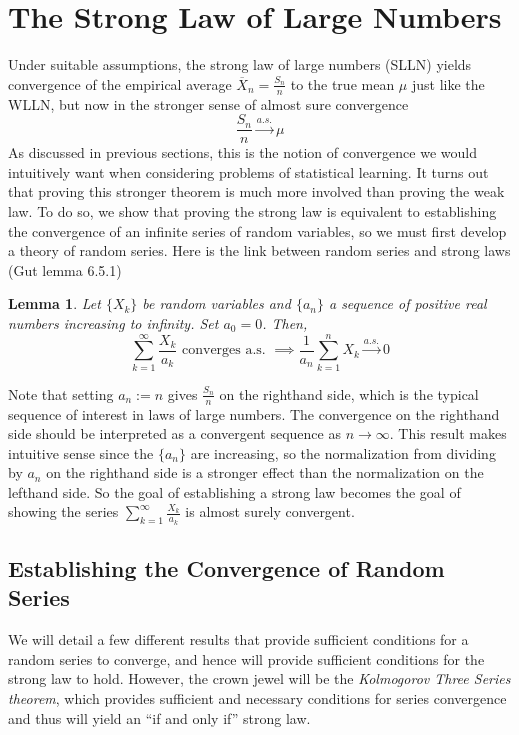 \documentclass[12pt]{article}
\newtheorem{lemma}{Lemma}
\begin{document}
\section{The Strong Law of Large Numbers}
Under suitable assumptions, the strong law of large numbers (SLLN) yields convergence of the empirical average $\overline{X}_n = \frac{S_n}{n}$ to the true mean $\mu$ just like the WLLN, but now in the stronger 
sense of almost sure convergence
\[\frac{S_n}{n} \overset{a.s.}{\to} \mu\]
As discussed in previous sections, this is the notion of convergence we would intuitively want when considering problems of statistical learning. It turns out that proving this stronger theorem is much more involved than 
proving the weak law. To do so, we show that proving the strong law is equivalent to establishing the convergence of an infinite series of random variables, so we must first develop a theory of random series. Here is the 
link between random series and strong laws (Gut lemma 6.5.1)
\begin{lemma}
Let $\{X_k\}$ be random variables and $\{a_n\}$ a sequence of positive real numbers increasing to infinity. Set $a_0 = 0$. Then, 
\[\sum_{k = 1}^{\infty} \frac{X_k}{a_k} \text{ converges a.s. } \implies \frac{1}{a_n} \sum_{k = 1}^{n} X_k \overset{a.s.}{\to} 0\]
\end{lemma}
Note that setting $a_n := n$ gives $\frac{S_n}{n}$ on the righthand side, which is the typical sequence of interest in laws of large numbers. The convergence on the righthand side should be interpreted 
as a convergent sequence as $n \to \infty$. This result makes intuitive sense since the $\{a_n\}$ are increasing, so the normalization from dividing by $a_n$ on the righthand side is a stronger effect than 
the normalization on the lefthand side. So the goal of establishing a strong law becomes the goal of showing the series $\sum_{k = 1}^{\infty} \frac{X_k}{a_k}$ is almost surely convergent. 

\subsection{Establishing the Convergence of Random Series}
We will detail a few different results that provide sufficient conditions for a random series to converge, and hence will provide sufficient conditions for the strong law to hold. However, the crown jewel will 
be the \textit{Kolmogorov Three Series theorem}, which provides sufficient and necessary conditions for series convergence and thus will yield an ``if and only if'' strong law.  
\end{document}
